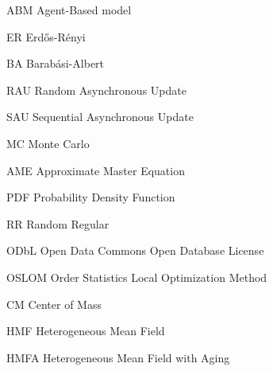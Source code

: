 \begin{abbreviations}
    \item[ABM] Agent-Based model
    \item[ER] Erd\H{o}s-R\'enyi
    \item[BA] Barab\'asi-Albert
    \item[RAU] Random Asynchronous Update
    \item[SAU] Sequential Asynchronous Update
    \item[MC] Monte Carlo
    \item[AME] Approximate Master Equation
    \item[PDF] Probability Density Function
    \item[RR] Random Regular
    \item[ODbL] Open Data Commons Open Database License
    \item[OSLOM] Order Statistics Local Optimization Method
    \item[CM] Center of Mass
    \item[HMF] Heterogeneous Mean Field
    \item[HMFA] Heterogeneous Mean Field with Aging
\end{abbreviations}